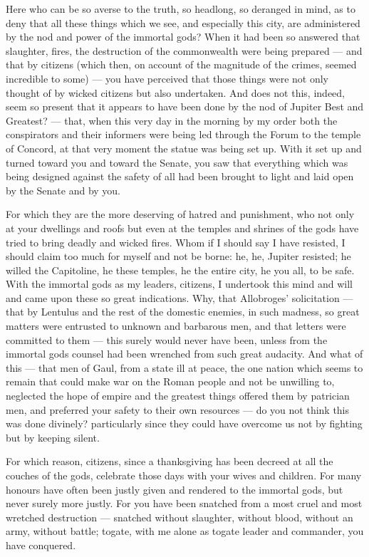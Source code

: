  Here who can be so averse to the truth, so headlong, so deranged in mind, as to deny that all these things which we see, and especially this city, are administered by the nod and power of the immortal gods? When it had been so answered that slaughter, fires, the destruction of the commonwealth were being prepared --- and that by citizens (which then, on account of the magnitude of the crimes, seemed incredible to some) --- you have perceived that those things were not only thought of by wicked citizens but also undertaken. And does not this, indeed, seem so present that it appears to have been done by the nod of Jupiter Best and Greatest? --- that, when this very day in the morning by my order both the conspirators and their informers were being led through the Forum to the temple of Concord, at that very moment the statue was being set up. With it set up and turned toward you and toward the Senate, you saw that everything which was being designed against the safety of all had been brought to light and laid open by the Senate and by you.

 For which they are the more deserving of hatred and punishment, who not only at your dwellings and roofs but even at the temples and shrines of the gods have tried to bring deadly and wicked fires. Whom if I should say I have resisted, I should claim too much for myself and not be borne: he, he, Jupiter resisted; he willed the Capitoline, he these temples, he the entire city, he you all, to be safe. With the immortal gods as my leaders, citizens, I undertook this mind and will and came upon these so great indications. Why, that Allobroges' solicitation --- that by Lentulus and the rest of the domestic enemies, in such madness, so great matters were entrusted to unknown and barbarous men, and that letters were committed to them --- this surely would never have been, unless from the immortal gods counsel had been wrenched from such great audacity. And what of this --- that men of Gaul, from a state ill at peace, the one nation which seems to remain that could make war on the Roman people and not be unwilling to, neglected the hope of empire and the greatest things offered them by patrician men, and preferred your safety to their own resources --- do you not think this was done divinely? particularly since they could have overcome us not by fighting but by keeping silent.

 For which reason, citizens, since a thanksgiving has been decreed at all the couches of the gods, celebrate those days with your wives and children. For many honours have often been justly given and rendered to the immortal gods, but never surely more justly. For you have been snatched from a most cruel and most wretched destruction --- snatched without slaughter, without blood, without an army, without battle; togate, with me alone as togate leader and commander, you have conquered.

